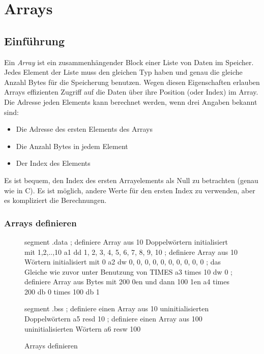 \chapter{Arrays}
\section{Einf\"{u}hrung}

Ein \emph{Array} ist ein zusammenh\"{a}ngender Block einer Liste von
Daten im Speicher. Jedes Element der Liste muss den gleichen Typ
haben und genau die gleiche Anzahl Bytes f\"{u}r die Speicherung
benutzen. Wegen diesen Eigenschaften erlauben Arrays effizienten
Zugriff auf die Daten \"{u}ber ihre Position (oder Index) im Array. Die
Adresse jeden Elements kann berechnet werden, wenn drei Angaben
bekannt sind:
\begin{itemize}
\parskip=-0.25em %

\item
Die Adresse des ersten Elements des Arrays

\item
Die Anzahl Bytes in jedem Element

\item
Der Index des Elements

\end{itemize}

Es ist bequem, den Index des ersten Arrayelements als Null zu
betrachten (genau wie in C). Es ist m\"{o}glich, andere Werte f\"{u}r den
ersten Index zu verwenden, aber es kompliziert die Berechnungen.

\subsection{Arrays definieren}

\begin{figure}[t]
\begin{AsmCodeListing}[frame=single, numbers=left, commandchars=\\\{\}]
 segment .data
 ; definiere Array aus 10 Doppelw\"{o}rtern initialisiert mit 1,2,..,10
 a1           dd    1, 2, 3, 4, 5, 6, 7, 8, 9, 10
 ; definiere Array aus 10 W\"{o}rtern initialisiert mit 0
 a2           dw    0, 0, 0, 0, 0, 0, 0, 0, 0, 0
 ; das Gleiche wie zuvor unter Benutzung von TIMES
 a3           times 10 dw 0
 ; definiere Array aus Bytes mit 200 0en und dann 100 1en
 a4           times 200 db 0
              times 100 db 1

 segment .bss
 ; definiere einen Array aus 10 uninitialisierten Doppelw\"{o}rtern
 a5           resd  10
 ; definiere einen Array aus 100 uninitialisierten W\"{o}rtern
 a6           resw  100
\end{AsmCodeListing}
\caption{Arrays definieren \label{fig:DataArrays}}
\end{figure}

